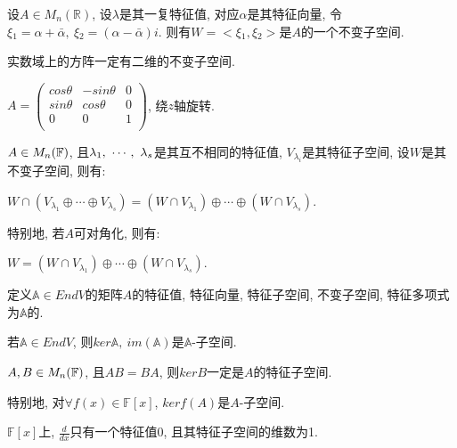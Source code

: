 \begin{example}
    设$A\in M_n(\mathbb{R})$, 设$\lambda$是其一复特征值, 对应$\alpha$是其特征向量, 令$\xi{_1}=\alpha + \bar{\alpha},\ \xi{_2}=(\alpha-\bar{\alpha})i$.
    则有$W=<\xi{_1}, \xi{_2}>$是$A$的一个不变子空间.\par
    实数域上的方阵一定有二维的不变子空间.
\end{example}

\begin{example}
    $A=\begin{pmatrix}
        cos\theta & -sin\theta & 0\\
        sin\theta & cos\theta  & 0\\
        0         & 0          & 1\\
    \end{pmatrix}$, 绕$z$轴旋转.
\end{example}

\begin{example}
    $A\in M_{n}(\mathbb{F})$, 且${\lambda}{_1},\ \cdots,\ {\lambda}{_{s}}$是其互不相同的特征值, $V_{\lambda{_i}}$是其特征子空间, 设$W$是其不变子空间, 则有:\par
    $W\cap(V_{\lambda{_1}}\oplus\cdots\oplus V_{\lambda{_s}})=(W\cap V_{\lambda{_1}})\oplus\cdots\oplus(W\cap V_{\lambda{_s}})$.\par
    特别地, 若$A$可对角化, 则有:\par
    $W=(W\cap V_{\lambda{_1}})\oplus\cdots\oplus (W\cap V_{\lambda{_s}})$.
\end{example}

\begin{definition}[线性变换的特征值等]
    定义$\mathbb{A}\in EndV$的矩阵$A$的特征值, 特征向量, 特征子空间, 不变子空间, 特征多项式为$\mathbb{A}$的.
\end{definition}

\begin{example}
    若$\mathbb{A}\in EndV$, 则$ker\mathbb{A},\ im(\mathbb{A})$是$\mathbb{A}$-子空间.
\end{example}

\begin{example}
    $A,B\in M_{n}(\mathbb{F})$, 且$AB=BA$, 则$kerB$一定是$A$的特征子空间.\par
    特别地, 对$\forall f(x)\in \mathbb{F}[x]$, $kerf(A)$是$A$-子空间.
\end{example}

\begin{example}
    $\mathbb{F}[x]$上, $\frac{d}{dx}$只有一个特征值$0$, 且其特征子空间的维数为1.
\end{example}

